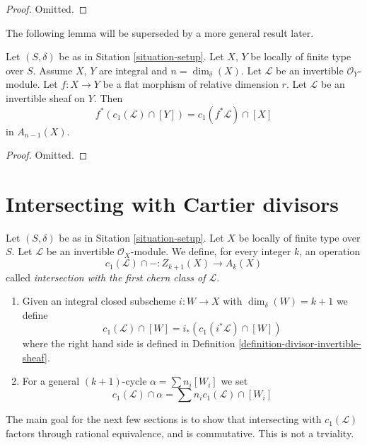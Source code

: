 \begin{proof}
Omitted.
\end{proof}

\noindent
The following lemma will be superseded by a more general result later.

\begin{lemma}
\label{lemma-flat-pullback-divisor-invertible-sheaf}
Let $(S, \delta)$ be as in Sitation \ref{situation-setup}.
Let $X$, $Y$ be locally of finite type over $S$. Assume $X$, $Y$
are integral and $n = \dim_\delta(X)$.
Let $\mathcal{L}$ be an invertible $\mathcal{O}_Y$-module.
Let $f : X \to Y$ be a flat morphism of relative dimension $r$.
Let $\mathcal{L}$ be an invertible sheaf on $Y$. Then
$$
f^*(c_1(\mathcal{L}) \cap [Y]) = c_1(f^*\mathcal{L}) \cap [X]
$$
in $A_{n - 1}(X)$.
\end{lemma}

\begin{proof}
Omitted.
\end{proof}



\section{Intersecting with Cartier divisors}
\label{section-intersecting-with-divisors}

\begin{definition}
\label{definition-cap-c1}
Let $(S, \delta)$ be as in Sitation \ref{situation-setup}.
Let $X$ be locally of finite type over $S$.
Let $\mathcal{L}$ be an invertible $\mathcal{O}_X$-module.
We define, for every integer $k$, an operation
$$
c_1(\mathcal{L}) \cap - :
Z_{k + 1}(X) \to A_k(X)
$$
called {\it intersection with the first chern class of $\mathcal{L}$}.
\begin{enumerate}
\item Given an integral closed subscheme $i : W \to X$ with
$\dim_\delta(W) = k + 1$ we define
$$
c_1(\mathcal{L}) \cap [W] = i_*(c_1({i^*\mathcal{L}}) \cap [W])
$$
where the right hand side is defined in
Definition \ref{definition-divisor-invertible-sheaf}.
\item For a general $(k + 1)$-cycle $\alpha = \sum n_i [W_i]$ we set
$$
c_1(\mathcal{L}) \cap \alpha = \sum n_i c_1(\mathcal{L}) \cap [W_i]
$$
\end{enumerate}
\end{definition}

\noindent
The main goal for the next few sections is to show that intersecting with
$c_1(\mathcal{L})$ factors through rational equivalence, and is commutative.
This is not a trviality.

